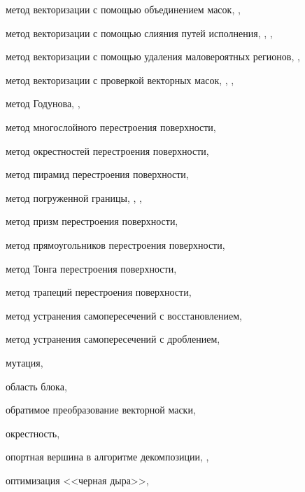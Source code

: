 метод векторизации с помощью объединением масок, \pageref{term:meth_vec_union}, \pageref{term:meth_vec_union2}

метод векторизации с помощью слияния путей исполнения, \pageref{term:meth_vec_merge}, \pageref{term:meth_vec_merge2}, \pageref{term:meth_vec_merge3}

метод векторизации с помощью удаления маловероятных регионов, \pageref{term:meth_vec_del_low_prob_regions}, \pageref{term:meth_vec_del_low_prob_regions2}

метод векторизации с проверкой векторных масок, \pageref{term:meth_vec_check}, \pageref{term:meth_vec_check2}, \pageref{term:meth_vec_check3}

метод Годунова, \pageref{term:godunov_method}, \pageref{term:godunov_method2}

метод многослойного перестроения поверхности, \pageref{term:method_remesh_multi}

метод окрестностей перестроения поверхности, \pageref{term:method_remesh_okr}

метод пирамид перестроения поверхности, \pageref{term:method_remesh_pyramid}

метод погруженной границы, \pageref{term:immersed_boundary_method}, \pageref{term:immersed_boundary_method2}, \pageref{term:immersed_boundary_method3}

метод призм перестроения поверхности, \pageref{term:method_remesh_prism}

метод прямоугольников перестроения поверхности, \pageref{term:method_remesh_rect}

метод Тонга перестроения поверхности, \pageref{term:method_remesh_tong}

метод трапеций перестроения поверхности, \pageref{term:method_remesh_trap}

метод устранения самопересечений с восстановлением, \pageref{term:method_selfint_repare}

метод устранения самопересечений с дроблением, \pageref{term:method_selfint_cut}

мутация, \pageref{term:mutation}

область блока, \pageref{term:block_scope}

обратимое преобразование векторной маски, \pageref{term:obratim_preobr}

окрестность, \pageref{term:okrestnost}

опортная вершина в алгоритме декомпозиции, \pageref{term:opor_point}, \pageref{term:opor_point2}

оптимизация <<черная дыра>>, \pageref{term:blackhome_optimization}

